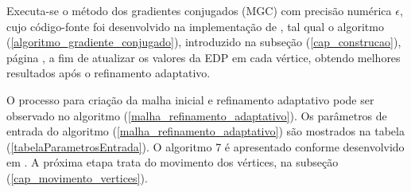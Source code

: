 Executa-se o método dos gradientes conjugados (MGC) com precisão numérica $\epsilon$, cujo código-fonte foi desenvolvido na implementação de , tal qual o algoritmo (\ref{algoritmo_gradiente_conjugado}), introduzido na subseção (\ref{cap_construcao}), página \pageref{algoritmo_gradiente_conjugado}, a fim de atualizar os valores da EDP em cada vértice, obtendo melhores resultados após o refinamento adaptativo. 

O processo para criação da malha inicial e refinamento adaptativo pode ser observado no algoritmo (\ref{malha_refinamento_adaptativo}). Os parâmetros de entrada do algoritmo (\ref{malha_refinamento_adaptativo}) são mostrados na tabela (\ref{tabelaParametrosEntrada}). O algoritmo 7 é apresentado conforme desenvolvido em . A próxima etapa trata do movimento dos vértices, na subseção (\ref{cap_movimento_vertices}). 


